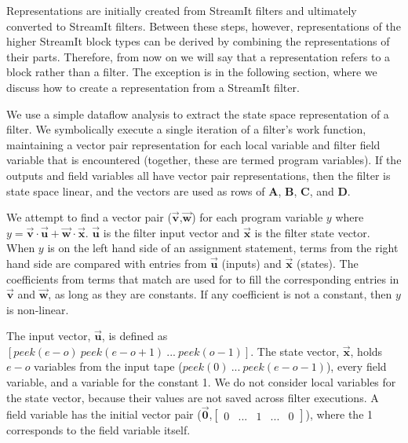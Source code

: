     Representations are initially created from StreamIt filters and
ultimately converted to StreamIt filters. Between these steps,
however, representations of the higher StreamIt block types can be
derived by combining the representations of their parts.  Therefore,
from now on we will say that a representation refers to a block rather
than a filter. The exception is in the following section, where we
discuss how to create a representation from a StreamIt filter.


    We use a simple dataflow analysis to extract the state space representation of
a filter. We symbolically execute a single iteration of a filter's
work function, maintaining a vector pair representation for each
local variable and filter field variable that is encountered
(together, these are termed program variables). If the outputs and
field variables all have vector pair representations, then the
filter is state space linear, and the vectors are used as rows of
$\mathbf{A}$, $\mathbf{B}$, $\mathbf{C}$, and $\mathbf{D}$. 

    We attempt to find a vector pair
($\vec{\mathbf{v}}$,$\vec{\mathbf{w}}$) for each program variable
$y$ where $y = \vec{\mathbf{v}} \cdot \vec{\mathbf{u}} +
\vec{\mathbf{w}} \cdot \vec{\mathbf{x}}$. $\vec{\mathbf{u}}$ is
the filter input vector and $\vec{\mathbf{x}}$ is the filter state
vector. When $y$ is on the left hand side of an assignment
statement, terms from the right hand side are compared with
entries from $\vec{\mathbf{u}}$ (inputs) and $\vec{\mathbf{x}}$
(states). The coefficients from terms that match are used for to
fill the corresponding entries in $\vec{\mathbf{v}}$ and
$\vec{\mathbf{w}}$, as long as they are constants. If any
coefficient is not a constant, then $y$ is non-linear.

    The input vector, $\vec{\mathbf{u}}$, is defined as $[peek(e-o)
~peek(e-o+1) ~... ~peek(o-1)]$. The state vector,
$\vec{\mathbf{x}}$, holds $e-o$ variables from the input tape
($peek(0) ~... ~peek(e-o-1)$), every field variable, and a
variable for the constant 1. We do not consider local variables
for the state vector, because their values are not saved across
filter executions. 
A field variable has the initial vector
pair ($\vec{\mathbf{0}}$,$\left [
\begin{array} {ccccc} 0 & ... & 1 & ... & 0 \end{array} \right
]$), where the 1 corresponds to the field variable itself.

